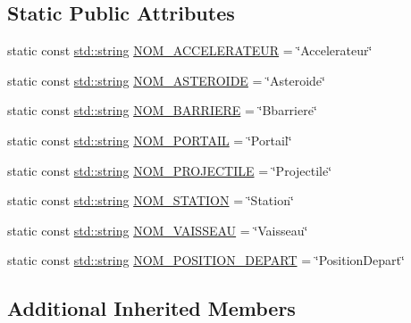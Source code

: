 \subsection*{Static Public Attributes}
\begin{DoxyCompactItemize}
\item 
static const \hyperlink{glew_8h_ae84541b4f3d8e1ea24ec0f466a8c568b}{std\-::string} \hyperlink{group__inf2990_ga445635db2cf91ecb46d96346f886100e}{N\-O\-M\-\_\-\-A\-C\-C\-E\-L\-E\-R\-A\-T\-E\-U\-R} = \char`\"{}Accelerateur\char`\"{}
\item 
static const \hyperlink{glew_8h_ae84541b4f3d8e1ea24ec0f466a8c568b}{std\-::string} \hyperlink{group__inf2990_gade5f55af8001f09e007aac6a010c3002}{N\-O\-M\-\_\-\-A\-S\-T\-E\-R\-O\-I\-D\-E} = \char`\"{}Asteroide\char`\"{}
\item 
static const \hyperlink{glew_8h_ae84541b4f3d8e1ea24ec0f466a8c568b}{std\-::string} \hyperlink{group__inf2990_gad41eac1b0b90d38de6c22a1a6547b1da}{N\-O\-M\-\_\-\-B\-A\-R\-R\-I\-E\-R\-E} = \char`\"{}Bbarriere\char`\"{}
\item 
static const \hyperlink{glew_8h_ae84541b4f3d8e1ea24ec0f466a8c568b}{std\-::string} \hyperlink{group__inf2990_ga71a649e3d19417d31752a25c002dc4d6}{N\-O\-M\-\_\-\-P\-O\-R\-T\-A\-I\-L} = \char`\"{}Portail\char`\"{}
\item 
static const \hyperlink{glew_8h_ae84541b4f3d8e1ea24ec0f466a8c568b}{std\-::string} \hyperlink{group__inf2990_ga81ea9b807a272a338c5be22bde0b6c65}{N\-O\-M\-\_\-\-P\-R\-O\-J\-E\-C\-T\-I\-L\-E} = \char`\"{}Projectile\char`\"{}
\item 
static const \hyperlink{glew_8h_ae84541b4f3d8e1ea24ec0f466a8c568b}{std\-::string} \hyperlink{group__inf2990_ga883f40a096fda37a70e165f7482946de}{N\-O\-M\-\_\-\-S\-T\-A\-T\-I\-O\-N} = \char`\"{}Station\char`\"{}
\item 
static const \hyperlink{glew_8h_ae84541b4f3d8e1ea24ec0f466a8c568b}{std\-::string} \hyperlink{group__inf2990_gaebd1eba0f3fb0438336bf104ab066f8e}{N\-O\-M\-\_\-\-V\-A\-I\-S\-S\-E\-A\-U} = \char`\"{}Vaisseau\char`\"{}
\item 
static const \hyperlink{glew_8h_ae84541b4f3d8e1ea24ec0f466a8c568b}{std\-::string} \hyperlink{group__inf2990_ga54efa483c652cb200fe18763b67cf0aa}{N\-O\-M\-\_\-\-P\-O\-S\-I\-T\-I\-O\-N\-\_\-\-D\-E\-P\-A\-R\-T} = \char`\"{}Position\-Depart\char`\"{}
\end{DoxyCompactItemize}
\subsection*{Additional Inherited Members}


